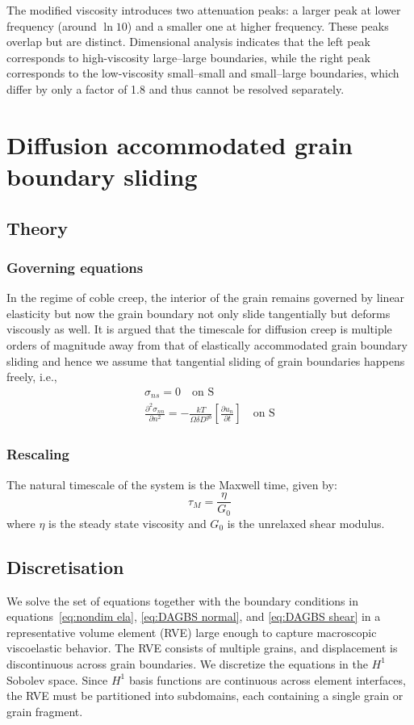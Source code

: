 \documentclass[12pt]{article}
\begin{document}
The modified viscosity introduces two attenuation peaks: a larger peak at lower frequency (around $\ln 10$) and a smaller one at higher frequency. These peaks overlap but are distinct. Dimensional analysis indicates that the left peak corresponds to high-viscosity large--large boundaries, while the right peak corresponds to the low-viscosity small--small and small--large boundaries, which differ by only a factor of 1.8 and thus cannot be resolved separately.


\newpage
\section{Diffusion accommodated grain boundary sliding}
\subsection{Theory}
\subsubsection{Governing equations}
In the regime of coble creep, the interior of the grain remains governed by linear elasticity but now the grain boundary not only slide tangentially but deforms viscously as well. It is argued that the timescale for diffusion creep is multiple orders of magnitude away from that of elastically accommodated grain boundary sliding and hence we assume that tangential sliding of grain boundaries happens freely, i.e.,
\begin{align}
    \sigma_{ns} = 0 \quad \text{on S} \label{eq:DAGBS shear}\\
    \frac{\partial^2\sigma_{nn}}{\partial n^2} = -\frac{kT}{\Omega\delta D^{gb}}[\frac{\partial u_n}{\partial t}]\quad  \label{eq:DAGBS normal}\text{on S}
\end{align}
\subsubsection{Rescaling}
The natural timescale of the system is the Maxwell time, given by:
\begin{equation}
    \tau _M = \frac{\eta}{G_0}
\end{equation}
where $\eta$ is the steady state viscosity and $G_0$ is the unrelaxed shear modulus.

\subsection{Discretisation}
We solve the set of equations together with the boundary conditions in equations~\ref{eq:nondim ela}, \ref{eq:DAGBS normal}, and \ref{eq:DAGBS shear} in a representative volume element (RVE) large enough to capture macroscopic viscoelastic behavior. The RVE consists of multiple grains, and displacement is discontinuous across grain boundaries. We discretize the equations in the $H^1$ Sobolev space. Since $H^1$ basis functions are continuous across element interfaces, the RVE must be partitioned into subdomains, each containing a single grain or grain fragment.
\end{document}
